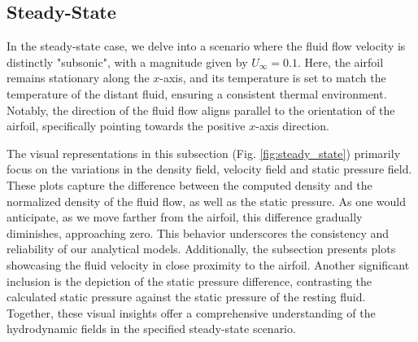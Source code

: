\subsection{Steady-State} \label{sec:Steady-State}
In the steady-state case, we delve into a scenario where the fluid flow velocity is distinctly "subsonic", with a magnitude given by $U_\infty = 0.1$. Here, the airfoil remains stationary along the $x$-axis, and its temperature is set to match the temperature of the distant fluid, ensuring a consistent thermal environment. Notably, the direction of the fluid flow aligns parallel to the orientation of the airfoil, specifically pointing towards the positive $x$-axis direction.

The visual representations in this subsection (Fig. \ref{fig:steady_state}) primarily focus on the variations in the density field, velocity field and static pressure field. These plots capture the difference between the computed density and the normalized density of the fluid flow, as well as the static pressure. As one would anticipate, as we move farther from the airfoil, this difference gradually diminishes, approaching zero. This behavior underscores the consistency and reliability of our analytical models. Additionally, the subsection presents plots showcasing the fluid velocity in close proximity to the airfoil. Another significant inclusion is the depiction of the static pressure difference, contrasting the calculated static pressure against the static pressure of the resting fluid. Together, these visual insights offer a comprehensive understanding of the hydrodynamic fields in the specified steady-state scenario.

